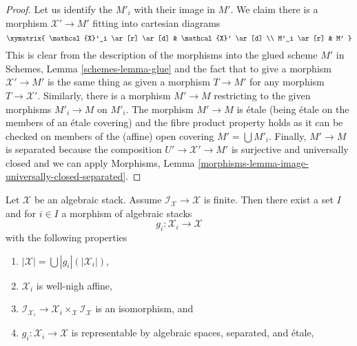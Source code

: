 \begin{proof}
Let us identify the $M'_i$ with their image in $M'$.
We claim there is a morphism $\mathcal{X}' \to M'$ fitting into
cartesian diagrams
$$
\xymatrix{
\mathcal{X}'_i \ar[r] \ar[d] & \mathcal{X}' \ar[d] \\
M'_i \ar[r] & M'
}
$$
This is clear from the description of the morphisms into the glued scheme $M'$
in Schemes, Lemma \ref{schemes-lemma-glue} and the fact that to give a morphism
$\mathcal{X}' \to M'$ is the same thing as given a morphism $T \to M'$
for any morphism $T \to \mathcal{X}'$.
Similarly, there is a morphism $M' \to M$ restricting to the
given morphisms $M'_i \to M$ on $M'_i$.
The morphism $M' \to M$ is \'etale (being \'etale on the members of an
\'etale covering) and the fibre product property holds as it can
be checked on members of the (affine) open covering $M' = \bigcup M'_i$.
Finally, $M' \to M$ is separated because the composition
$U' \to \mathcal{X}' \to M'$ is surjective and universally closed
and we can apply Morphisms, Lemma
\ref{morphisms-lemma-image-universally-closed-separated}.
\end{proof}

\begin{lemma}
\label{lemma-etale-local-finite-inertia}
Let $\mathcal{X}$ be an algebraic stack. Assume
$\mathcal{I}_\mathcal{X} \to \mathcal{X}$ is finite.
Then there exist a set $I$ and for $i \in I$ a morphism of algebraic stacks
$$
g_i : \mathcal{X}_i \longrightarrow \mathcal{X}
$$
with the following properties
\begin{enumerate}
\item $|\mathcal{X}| = \bigcup |g_i|(|\mathcal{X}_i|)$,
\item $\mathcal{X}_i$ is well-nigh affine,
\item $\mathcal{I}_{\mathcal{X}_i} \to
\mathcal{X}_i \times_\mathcal{X} \mathcal{I}_\mathcal{X}$
is an isomorphism, and
\item $g_i : \mathcal{X}_i \to \mathcal{X}$ is representable
by algebraic spaces, separated, and \'etale,
\end{enumerate}
\end{lemma}

